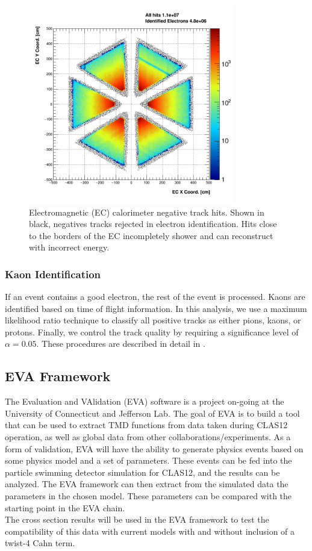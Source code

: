 \begin{figure}
  \centering
  \includegraphics[width=9cm]{image/ECFiducial.png}
  \caption{Electromagnetic (EC) calorimeter negative track hits.  Shown in black, negatives tracks rejected in electron identification.  Hits close to the borders of the EC incompletely shower and can reconstruct with incorrect energy.}
  \label{fig:ecfid}
\end{figure}

\subsubsection{Kaon Identification}
If an event contains a good electron, the rest of the event is processed.  Kaons are identified based on time of flight information.  In this analysis, we use a maximum likelihood ratio technique to classify all positive tracks as either pions, kaons, or protons.  Finally, we control the track quality by requiring a significance level of $\alpha = 0.05$.  These procedures are described in detail in \cite{kaon-note}.

\subsection{EVA Framework}
The Evaluation and VAlidation (EVA) software is a project on-going at the University of Connecticut and Jefferson Lab.  The goal of EVA is to build a tool that can be used to extract TMD functions from data taken during CLAS12 operation, as well as global data from other collaborations/experiments.  As a form of validation, EVA will have the ability to generate physics events based on some physics model and a set of parameters.  These events can be fed into the particle swimming detector simulation for CLAS12, and the results can be analyzed.  The EVA framework can then extract from the simulated data the parameters in the chosen model.  These parameters can be compared with the starting point in the EVA chain. \\

The cross section results will be used in the EVA framework to test the compatibility of this data with current models with and without inclusion of a twist-4 Cahn term.
